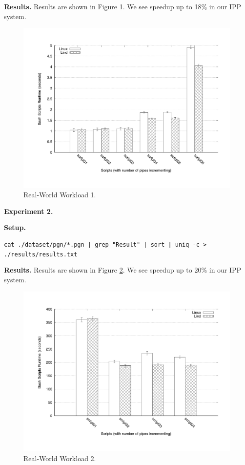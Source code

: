 \noindent
\textbf{Results.}
Results are shown in Figure \ref{fig:results01}. 
We see speedup up to 18\% in our IPP system. 

\begin{figure}
\centering
\includegraphics[width=1.0\columnwidth]{diagram/results01.png}
\caption{\small Real-World Workload 1.}
\label{fig:results01}
\end{figure}

\noindent
\textbf{Experiment 2.}

\noindent
\textbf{Setup.}

\texttt{cat ./dataset/pgn/*.pgn | grep "Result" | sort | uniq -c > ./results/results.txt} 


\noindent
\textbf{Results.}
Results are shown in Figure \ref{fig:results02}. 
We see speedup up to 20\% in our IPP system. 

\begin{figure}
\centering
\includegraphics[width=1.0\columnwidth]{diagram/results02.png}
\caption{\small Real-World Workload 2.}
\label{fig:results02}
\end{figure}